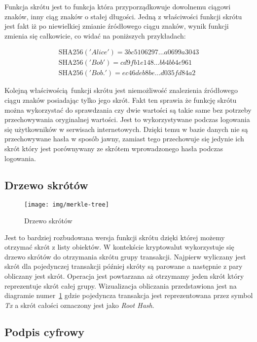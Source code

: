 \documentclass[conference]{IEEEtran}
\begin{document}
Funkcja skrótu jest to funkcja która przyporządkowuje dowolnemu ciągowi znaków, inny ciąg znaków o stałej długości.
Jedną z właściwości funkcji skrótu jest fakt iż po niewielkiej zmianie źródłowego ciągu znaków, wynik funkcji zmienia się
całkowicie, co widać na poniższych przykładach:

\begin{gather}
\text{SHA256} ('Alice') = 3bc5106297 \ldots a0699a3043 \\
\text{SHA256} ('Bob') = cd9fb1e148 \ldots bb4bb4e961 \\
\text{SHA256} ('Bob.') = ec46deb8be \ldots d035fd84a2
\end{gather}

Kolejną właściwością funkcji skrótu jest niemożliwość znalezienia źródłowego ciągu znaków posiadając tylko jego skrót.
Fakt ten sprawia że funkcję skrótu można wykorzystać do sprawdzania czy dwie wartości są takie same bez potrzeby przechowywania
oryginalnej wartości. Jest to wykorzystywane podczas logowania się użytkowników w serwisach internetowych. Dzięki temu
w bazie danych nie są przechowywane hasła w sposób jawny, zamiast tego przechowuje się jedynie ich skrót który jest
porównywany ze skrótem wprowadzonego hasła podczas logowania.

\subsection{Drzewo skrótów}

\begin{figure}[!t]
  \centering
  \texttt{[image: img/merkle-tree]}
  \caption{Drzewo skrótów}
  \label{fig:merkle}
\end{figure}

Jest to bardziej rozbudowana wersja funkcji skrótu dzięki której możemy otrzymać skrót z listy obiektów. W kontekście
kryptowalut wykorzystuje się drzewo skrótów do otrzymania skrótu grupy transakcji. Najpierw wyliczany jest skrót dla
pojedynczej transakcji później skróty są parowane a następnie z pary obliczany jest skrót. Operacja jest powtarzana aż
otrzymamy jeden skrót który reprezentuje skrót całej grupy. Wizualizacja obliczania przedstawiona jest na diagramie
numer~\ref{fig:merkle} gdzie pojedyncza transakcja jest reprezentowana przez symbol \textit{Tx} a skrót całości
oznaczony jest jako \textit{Root Hash}.

\subsection{Podpis cyfrowy}
\end{document}
